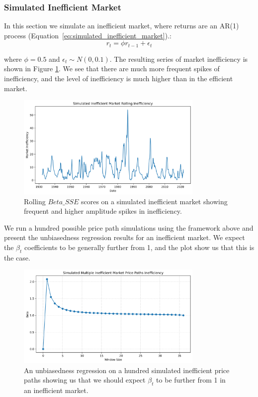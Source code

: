 \subsubsection{Simulated Inefficient Market}
In this section we simulate an inefficient market, where returns are an AR(1) process (Equation~\ref{eq:simulated_inefficient_market}).:
\begin{equation}
    r_t = \phi r_{t-1} + \epsilon_t
    \label{eq:simulated_inefficient_market}
\end{equation}

where $\phi = 0.5$ and $\epsilon_t \sim N(0, 0.1)$. The resulting series of market inefficiency
 is shown in Figure \ref{fig:inefficient_market}. We see that there are much more frequent spikes of inefficiency, and the level of inefficiency is much higher than in the efficient market.

\begin{figure}[h!]
    \centering
    \includegraphics[width=0.8\textwidth]{../figs/Simulated Inefficient Market Rolling Inefficiency.png}
    \caption{Rolling $Beta\_SSE$ scores on a simulated inefficient market showing frequent and higher amplitude spikes in inefficiency.}
    \label{fig:inefficient_market}
\end{figure}

We run a hundred possible price path simulations using the framework above and present the unbiasedness regression results for an inefficient market.
We expect the $\beta_t$ coefficients to be generally further from 1, and the plot show us that this is the case.

\begin{figure}[h!]
    \centering
    \includegraphics[width=0.8\textwidth]{../figs/Simulated Multiple Inefficient Market Price Paths Inefficiency.png}
    \caption{An unbiasedness regression on a hundred simulated inefficient price paths showing us that we should expect $\beta_t$ to be further from 1 in an inefficient market.}
    \label{fig:inefficient_market_unbiasedness}
\end{figure}

